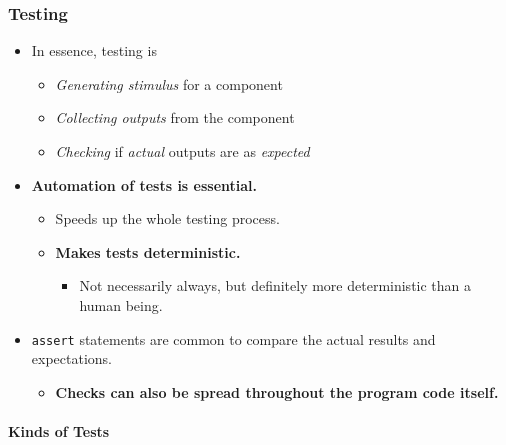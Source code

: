 \documentclass[a4paper]{article}
\providecommand{\tightlist}{%
  \setlength{\itemsep}{0pt}\setlength{\parskip}{0pt}}
\let\oldparagraph\paragraph
\renewcommand{\paragraph}[1]{\oldparagraph{#1}\mbox{}}
\begin{document}
\hypertarget{testing}{%
\subsubsection{Testing}\label{testing}}

\begin{itemize}
\tightlist
\item
  In essence, testing is

  \begin{itemize}
  \tightlist
  \item
    \emph{Generating stimulus} for a component
  \item
    \emph{Collecting outputs} from the component
  \item
    \emph{Checking} if \emph{actual} outputs are as \emph{expected}
  \end{itemize}
\item
  \textbf{Automation of tests is essential.}

  \begin{itemize}
  \tightlist
  \item
    Speeds up the whole testing process.
  \item
    \textbf{Makes tests deterministic.}

    \begin{itemize}
    \tightlist
    \item
      Not necessarily always, but definitely more deterministic than a
      human being.
    \end{itemize}
  \end{itemize}
\item
  \texttt{assert} statements are common to compare the actual results
  and expectations.

  \begin{itemize}
  \tightlist
  \item
    \textbf{Checks can also be spread throughout the program code
    itself.}
  \end{itemize}
\end{itemize}

\hypertarget{kinds-of-tests}{%
\paragraph{Kinds of Tests}\label{kinds-of-tests}}
\end{document}
